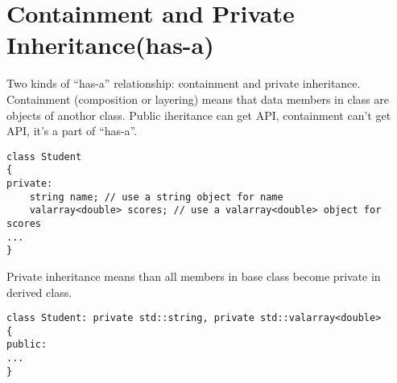 \documentclass[10pt,a4paper,oneside]{article}
\begin{document}
\section{Containment and Private Inheritance(has-a)}
Two kinds of ``has-a'' relationship: containment and private inheritance.\\
Containment (composition or layering) means that data members in class are objects of anothor class. Public iheritance can get API, containment can't get API, it's a part of ``has-a''.
\begin{lstlisting}
class Student
{
private:
    string name; // use a string object for name
    valarray<double> scores; // use a valarray<double> object for scores
...
}
\end{lstlisting}
Private inheritance means than all members in base class become private in derived class.
\begin{lstlisting}
class Student: private std::string, private std::valarray<double>
{
public:
...
}
\end{lstlisting}
\end{document}
